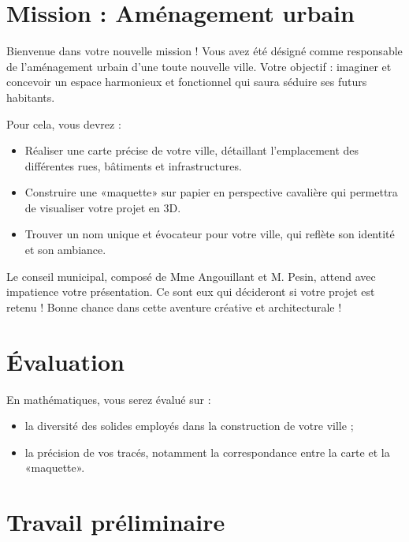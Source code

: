 \emptyBackground
\def\authors{Mme ANGOUILLANT et M. PESIN}

\small

\section*{Mission : Aménagement urbain}
\vspace{-0.15cm}

Bienvenue dans votre nouvelle mission !
Vous avez été désigné comme responsable de l'aménagement urbain d'une toute nouvelle ville.
Votre objectif : imaginer et concevoir un espace harmonieux et fonctionnel qui saura séduire ses futurs habitants.

Pour cela, vous devrez :
\begin{itemize}
    \item Réaliser une carte précise de votre ville, détaillant l'emplacement des différentes rues, bâtiments et infrastructures.
    \item Construire une «maquette» sur papier en perspective cavalière qui permettra de visualiser votre projet en 3D.
    \item Trouver un nom unique et évocateur pour votre ville, qui reflète son identité et son ambiance.
\end{itemize}

Le conseil municipal, composé de Mme Angouillant et M. Pesin, attend avec impatience votre présentation.
Ce sont eux qui décideront si votre projet est retenu !
Bonne chance dans cette aventure créative et architecturale !
\vspace{-0.5cm}
\section*{Évaluation}
\vspace{-0.15cm}
En mathématiques, vous serez évalué sur :
\begin{itemize}
    \item la diversité des solides employés dans la construction de votre ville ;
    \item la précision de vos tracés, notamment la correspondance entre la carte et la «maquette».
\end{itemize}

\vspace{-0.5cm}
\section*{Travail préliminaire}
\vspace{-0.15cm}

